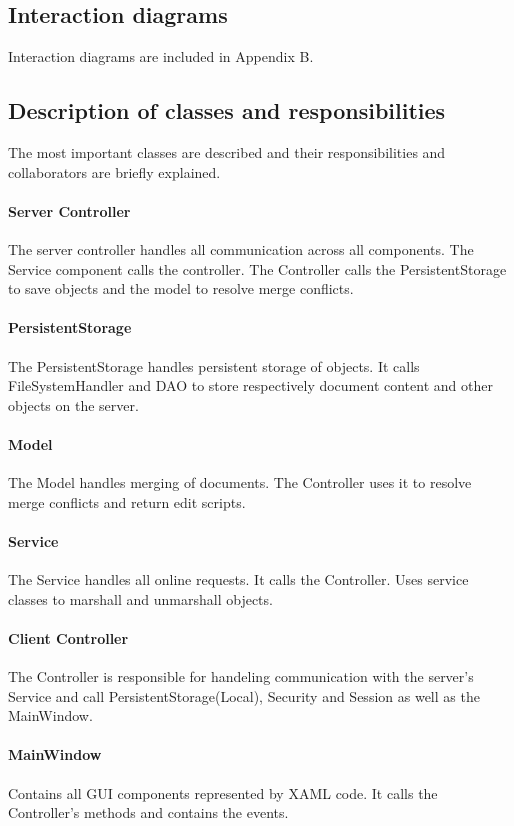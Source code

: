 \documentclass[a4paper,11pt,report]{report}
\begin{document}
\subsection{Interaction diagrams}
Interaction diagrams are included in Appendix B.

\subsection{Description of classes and responsibilities}
The most important classes are described and their responsibilities and collaborators are briefly explained.
\paragraph{Server Controller}
The server controller handles all communication across all components. The Service component calls the controller. The Controller calls the PersistentStorage to save objects and the model to resolve merge conflicts.
\paragraph{PersistentStorage}
The PersistentStorage handles persistent storage of objects. It calls FileSystemHandler and DAO to store respectively document content and other objects on the server.
\paragraph{Model}
The Model handles merging of documents. The Controller uses it to resolve merge conflicts and return edit scripts.
\paragraph{Service}
The Service handles all online requests. It calls the Controller. Uses service classes to marshall and unmarshall objects.
\paragraph{Client Controller}
The Controller is responsible for handeling communication with the server's Service and call PersistentStorage(Local), Security and Session as well as the MainWindow.
\paragraph{MainWindow}
Contains all GUI components represented by XAML code. It calls the Controller's methods and contains the events.
\end{document}

